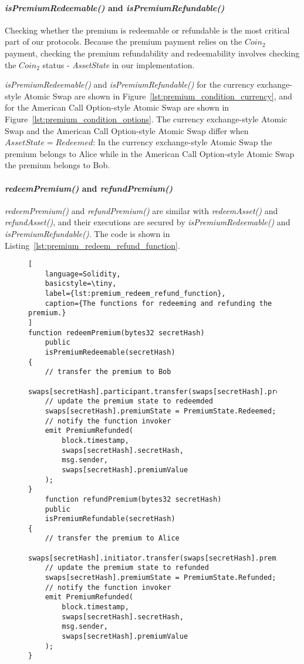 \paragraph{\textit{isPremiumRedeemable()} and \textit{isPremiumRefundable()}}
Checking whether the premium is redeemable or refundable is the most critical part of our protocols.
Because the premium payment relies on the $Coin_2$ payment, checking the premium refundability and redeemability involves checking the $Coin_2$ status - \textit{AssetState} in our implementation.

\textit{isPremiumRedeemable()} and \textit{isPremiumRefundable()} for the currency exchange-style Atomic Swap are shown in Figure~\ref{lst:premium_condition_currency}, and for the American Call Option-style Atomic Swap are shown in Figure~\ref{lst:premium_condition_options}.
The currency exchange-style Atomic Swap and the American Call Option-style Atomic Swap differ when $AssetState = Redeemed$:
In the currency exchange-style Atomic Swap the premium belongs to Alice while in the American Call Option-style Atomic Swap the premium belongs to Bob.

\paragraph{\textit{redeemPremium()} and \textit{refundPremium()}}

\textit{redeemPremium()} and \textit{refundPremium()} are similar with \textit{redeemAsset()} and \textit{refundAsset()}, and their executions are secured by \textit{isPremiumRedeemable()} and \textit{isPremiumRefundable()}.
The code is shown in Listing~\ref{lst:premium_redeem_refund_function}.

\begin{figure}[htb]
\begin{lstlisting}[
    language=Solidity, 
    basicstyle=\tiny,
    label={lst:premium_redeem_refund_function},
    caption={The functions for redeeming and refunding the premium.}
]
function redeemPremium(bytes32 secretHash)
    public
    isPremiumRedeemable(secretHash)
{
    // transfer the premium to Bob
    swaps[secretHash].participant.transfer(swaps[secretHash].premiumValue);
    // update the premium state to redeemded
    swaps[secretHash].premiumState = PremiumState.Redeemed;
    // notify the function invoker
    emit PremiumRefunded(
        block.timestamp,
        swaps[secretHash].secretHash,
        msg.sender,
        swaps[secretHash].premiumValue
    );
}
    function refundPremium(bytes32 secretHash)
    public
    isPremiumRefundable(secretHash)
{
    // transfer the premium to Alice
    swaps[secretHash].initiator.transfer(swaps[secretHash].premiumValue);
    // update the premium state to refunded
    swaps[secretHash].premiumState = PremiumState.Refunded;
    // notify the function invoker
    emit PremiumRefunded(
        block.timestamp,
        swaps[secretHash].secretHash,
        msg.sender,
        swaps[secretHash].premiumValue
    );
}
\end{lstlisting}
\end{figure}

